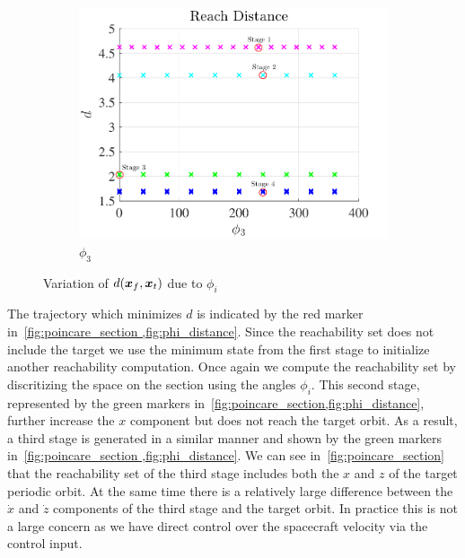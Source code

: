 \documentclass[]{aiaa-tc}%
\begin{document}
\begin{figure}[htbp]
    \begin{subfigure}[htbp]{0.3\textwidth} 
        \includegraphics[width=\textwidth]{figures/phi3.pdf} 
        \caption{\( \phi_3 \)} \label{fig:phi3} 
    \end{subfigure} 
    \caption{Variation of \(d(\bm{x}_f,\bm{x}_t)\) due to \( \phi_i\)}
    \label{fig:phi_distance} 
\end{figure}

The trajectory which minimizes \( d \) is indicated by the red marker in~\cref{fig:poincare_section ,fig:phi_distance}.
Since the reachability set does not include the target we use the minimum state from the first stage to initialize another reachability computation.
Once again we compute the reachability set by discritizing the space on the \Poincare section using the angles \( \phi_i \).
This second stage, represented by the green markers in~\cref{fig:poincare_section,fig:phi_distance}, further increase the \( x \) component but does not reach the target orbit.
As a result, a third stage is generated in a similar manner and shown by the green markers in~\cref{fig:poincare_section ,fig:phi_distance}.
We can see in~\cref{fig:poincare_section} that the reachability set of the third stage includes both the \( x \) and \( z\) of the target periodic orbit.
At the same time there is a relatively large difference between the \( \dot{x} \) and \( \dot{z} \) components of the third stage and the target orbit.
In practice this is not a large concern as we have direct control over the spacecraft velocity via the control input.
\end{document}
